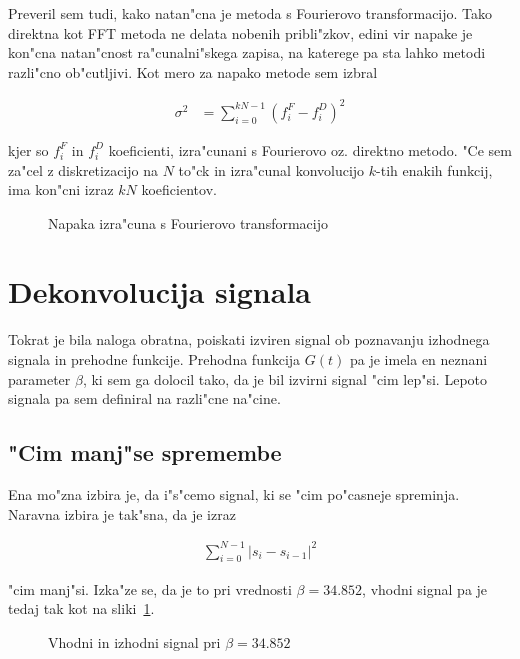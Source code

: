 \documentclass[a4paper,10pt]{article}
\begin{document}
Preveril sem tudi, kako natan"cna je metoda s Fourierovo transformacijo. Tako direktna kot FFT metoda ne delata nobenih pribli"zkov, edini vir napake je kon"cna natan"cnost ra"cunalni"skega zapisa, na katerege pa sta lahko metodi razli"cno ob"cutljivi. Kot mero za napako metode sem izbral

\begin{align}
 \sigma^2 &= \sum_{i=0}^{kN-1} (f_i^F - f_i^D)^2
\end{align}

kjer so $f_i^F$ in $f_i^D$ koeficienti, izra"cunani s Fourierovo oz. direktno metodo. "Ce sem za"cel z diskretizacijo na $N$ to"ck in izra"cunal konvolucijo $k$-tih enakih funkcij, ima kon"cni izraz $kN$ koeficientov. 


\begin{figure}[h]
 \centering

\caption{Napaka izra"cuna s Fourierovo transformacijo}
\end{figure}

\section{Dekonvolucija signala}

Tokrat je bila naloga obratna, poiskati izviren signal ob poznavanju izhodnega signala in prehodne funkcije. Prehodna funkcija $G(t)$ pa je imela en neznani parameter $\beta$, ki sem ga dolocil tako, da je bil izvirni signal "cim lep"si. Lepoto signala pa sem definiral na razli"cne na"cine. 

\begin{figure}[h]
 
\end{figure}


\subsection{"Cim manj"se spremembe}

Ena mo"zna izbira je, da i"s"cemo signal, ki se "cim po"casneje spreminja. Naravna izbira je tak"sna, da je izraz

\begin{align}
  \sum_{i=0}^{N-1} \left| s_i - s_{i-1}\right|^2
\end{align}

"cim manj"si. Izka"ze se, da je to pri vrednosti $\beta = 34.852$, vhodni signal pa je tedaj tak kot na sliki~\ref{fig:dekon-signal}. 

\begin{figure}[h]
 
\caption{Vhodni in izhodni signal pri $\beta = 34.852$}
\label{fig:dekon-signal}
\end{figure}
\end{document}
